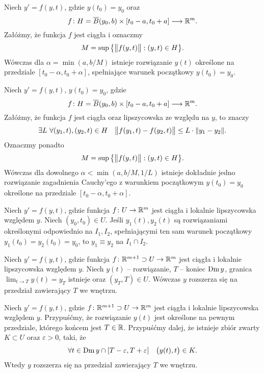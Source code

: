 
\begin{theorem}[Peano]
  Niech $y' = f(y,t)$, gdzie $y(t_0) = y_0$ oraz
  \[
    f \colon H = \overline{B} (y_0, b) \times [t_0 - a, t_0 + a] \longrightarrow \R^m.
  \]
  Załóżmy, że funkcja $f$ jest ciągła i oznaczmy
  \[
    M = \sup \big\{ \norm[\big]{f(y,t)} : (y, t) \in H \big\}.
  \]
  Wówczas dla $\alpha = \min(a, b/M)$ istnieje rozwiązanie $y(t)$ określone na
  przedziale $[t_0 - \alpha, t_0 + \alpha]$, spełniające warunek początkowy $y(t_0) = y_0$.
\end{theorem}

\begin{theorem}
  Niech $y' = f(y,t)$, $y(t_0) = y_0$, gdzie
  \[
    f \colon H = \overline{B} (y_0, b) \times [t_0 - a, t_0 + a] \longrightarrow \R^m.
  \]
  Załóżmy, że funkcja $f$ jest ciągła oraz lipszycowska ze względu na $y$, to znaczy
  \[
    \exists L \ \forall (y_1,t), (y_2,t) \in H \quad
    \norm[\big]{f(y_1,t) - f(y_2,t)} \leq L \cdot \norm{y_1 - y_2}.
  \]
  Oznaczmy ponadto
  \[
    M = \sup \big\{ \norm[\big]{f(y,t)} : (y, t) \in H \big\}.
  \]
  Wówczas dla dowolnego $\alpha < \min(a, b/M, 1/L)$ istnieje dokładnie jedno rozwiązanie
  zagadnienia Cauchy'ego z warunkiem początkowym $y(t_0) = y_0$ określone na przedziale
  $[t_0 - \alpha, t_0 + \alpha]$.
\end{theorem}

\begin{lemma}
  Niech $y' = f(y,t)$, gdzie funkcja $f \colon U \to \R^m$ jest ciągła i lokalnie lipszycowska
  względem $y$. Niech $(y_0,t_0) \in U$. Jeśli $y_1(t), y_2(t)$ są rozwiązaniami określonymi
  odpowiednio na $I_1, I_2$, spełniającymi ten sam warunek początkowy $y_1(t_0) = y_2(t_0) = y_0$,
  to $y_1 \equiv y_2$ na $I_1 \cap I_2$.
\end{lemma}

\begin{lemma}
  Niech $y' = f(y,t)$, gdzie funkcja $f \colon \R^{m+1} \supset U \to \R^m$ jest ciągła i lokalnie
  lipszycowska względem $y$. Niech $y(t)$ -- rozwiązanie, $T$ -- koniec $\Dm y$, granica
  $\lim_{t \to T} y(t) = y_T$ istnieje oraz $(y_T, T) \in U$. Wówczas $y$ rozszerza się na przedział
  zawierający $T$ we wnętrzu.
\end{lemma}

\begin{theorem}
  Niech $y' = f(y,t)$, gdzie $f \colon \R^{m+1} \supset U \to \R^m$ jest ciągła i lokalnie
  lipszycowska względem $y$. Przypuśćmy, że rozwiązanie $y(t)$ jest określone na pewnym przedziale,
  którego końcem jest $T \in \R$. Przypuśćmy dalej, że istnieje zbiór zwarty $K \subset U$ oraz
  $\varepsilon > 0$, taki, że
  \[
    \forall t \in \Dm y \cap [T - \varepsilon, T + \varepsilon] \quad \p[\big]{y(t), t} \in K.
  \]
  Wtedy $y$ rozszerza się na przedział zawierający $T$ we wnętrzu.
\end{theorem}

